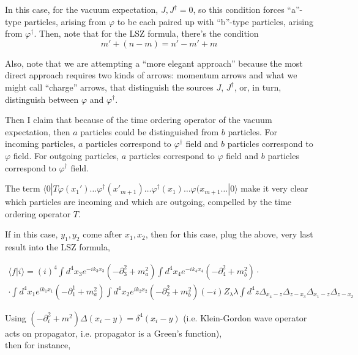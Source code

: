 \documentclass[twoside]{amsart}
\begin{document}
In this case, for the vacuum expectation, $J, J^{\dag} =0$, so this condition forces ``a''-type particles, arising from $\varphi$ to be each paired up with ``b''-type particles, arising from $\varphi^{\dag}$.  Then, note that for the LSZ formula, there's the condition
\[
m' + (n-m) = n' - m' + m 
\]

Also, note that we are attempting a ``more elegant approach'' because the most direct approach requires two kinds of arrows: momentum arrows and what we might call ``charge'' arrows, that distinguish the sources $J$, $J^{\dag}$, or, in turn, distinguish between $\varphi$ and $\varphi^{\dag}$.  


Then I claim that because of the time ordering operator of the vacuum expectation, then $a$ particles could be distinguished from $b$ particles.  For incoming particles, $a$ particles correspond to $\varphi^{\dag}$ field and $b$ particles correspond to $\varphi$ field.  For outgoing particles, $a$ particles correspond to $\varphi$ field and $b$ particles correspond to $\varphi^{\dag}$ field.  

The term $\langle 0 | T \varphi(x_1') \dots \varphi^{\dag}(x'_{m+1}) \dots \varphi^{\dag}(x_1) \dots \varphi(x_{m+1} \dots | 0 \rangle$ make it very clear which particles are incoming and which are outgoing, compelled by the time ordering operator $T$.  



If in this case, $y_1, y_2$ come after $x_1, x_2$, then for this case, plug the above, very last result into the LSZ formula,

\[
\begin{gathered}
  \langle f | i \rangle = (i)^4 \int d^4x_3 e^{ - i k_{3} x_3 } (- \partial_{3}^2 + m_a^2) \int d^4x_4 e^{ -i k_{4} x_4 } ( - \partial_{4}^2 + m_b^2 ) \cdot \\ 
  \cdot \int d^4x_1 e^{i k_1 x_1} ( - \partial_1^1 + m_a^2) \int d^4x_2 e^{ik_2 x_2} (- \partial_2^2 + m_b^2)  ( -i) Z_{\lambda} \lambda \int d^4z \Delta_{x_4 - z} \Delta_{z -x_3 } \Delta_{x_1-z} \Delta_{z-x_2}
\end{gathered}
\]

Using $(-\partial_i^2 + m^2) \Delta(x_i - y) = \delta^4(x_i - y)$ (i.e. Klein-Gordon wave operator acts on propagator, i.e. propagator is a Green's function), \\
then for instance, 
\end{document}
